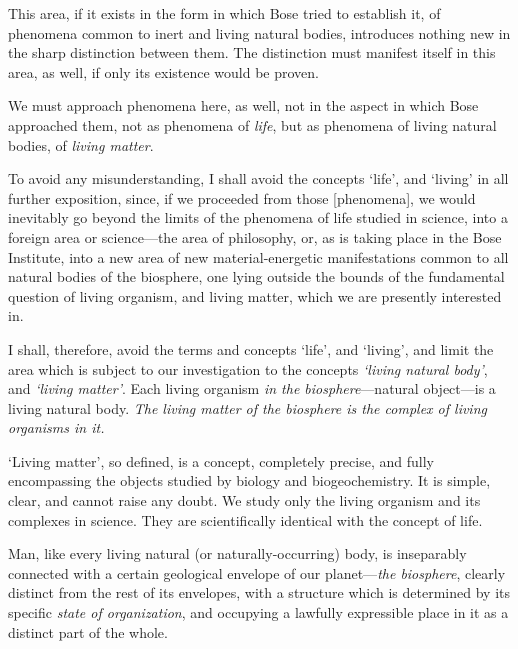 This area, if it exists in the form in which Bose tried to establish it, of
phenomena common to inert and living natural bodies, introduces nothing new in
the sharp distinction between them.  The distinction must manifest itself in
this area, as well, if only its existence would be proven.

We must approach phenomena here, as well, not in the aspect in which Bose
approached them, not as phenomena of \emph{life}, but as phenomena of living
natural bodies, of \emph{living matter}.

To avoid any misunderstanding, I shall avoid the concepts `life', and `living'
in all further exposition, since, if we proceeded from those
[phenomena], we would inevitably go beyond the limits of the phenomena of life studied in
science, into a foreign area or science---the area of philosophy, or, as is
taking place in the Bose Institute, into a new area of new material-energetic
manifestations common to all natural bodies of the biosphere, one lying outside
the bounds of the fundamental question of living organism, and living matter,
which we are presently interested in.

I shall, therefore, avoid the terms and concepts `life', and `living', and
limit the area which is subject to our investigation to the concepts
\emph{`living natural body'}, and \emph{`living matter'}.  Each living organism
\emph{in the biosphere}---natural object---is a living natural body.  \emph{The
living matter of the biosphere is the complex of living organisms in it.}

`Living matter', so defined, is a concept, completely precise, and fully
encompassing the objects studied by biology and biogeochemistry.  It is simple,
clear, and cannot raise any doubt.  We study only the living organism and its
complexes in science.  They are scientifically identical with the concept of
life.


\Section %
Man, like every living natural (or naturally-occurring) body, is inseparably connected with a certain geological envelope of our
planet---\emph{the biosphere}, clearly distinct from the rest of its envelopes,
with a structure which is determined by its specific \emph{state of
organization}, and occupying a lawfully expressible place in it as a distinct part of the
whole.


